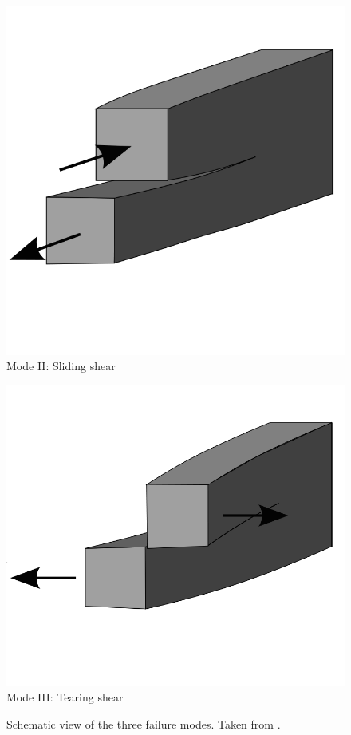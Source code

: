 \documentclass[
documentsize = a4, %
font = cmr, %
typesize = 11, %
printmode = true,
onehalfspacing = true,
language = en, %
titlepage = udciccp, %
degree = pt, %
dedication = true,
acknowledgements = true,
abstract-en = true,
abstract-es = false,
abstract-ga = false,
epigraphs = true,
toc = true,
lof = true,
lot = true,
frontmatterintoc = false,
notation = false,
minimal = false,
]{UDCthesis}
\begin{document}
\begin{figure}
\begin{minipage}[b]{.3\columnwidth}
	\centering
	\includegraphics[width=\columnwidth]{IMG_CUTRES/wikipedia_failure_modes_2}
			Mode II: Sliding shear
\end{minipage}
\hfill
\begin{minipage}[b]{.3\columnwidth}
	\centering
	\includegraphics[width=\columnwidth]{IMG_CUTRES/wikipedia_failure_modes_3}
			Mode III: Tearing shear
\end{minipage}
	\caption[Schematic view of the three failure modes.]{Schematic view of the three failure modes. Taken from \citep{wiki_fracture_modes}.}
	\label{fig:wikipedia_failure_modes}
\end{figure}
\end{document}

